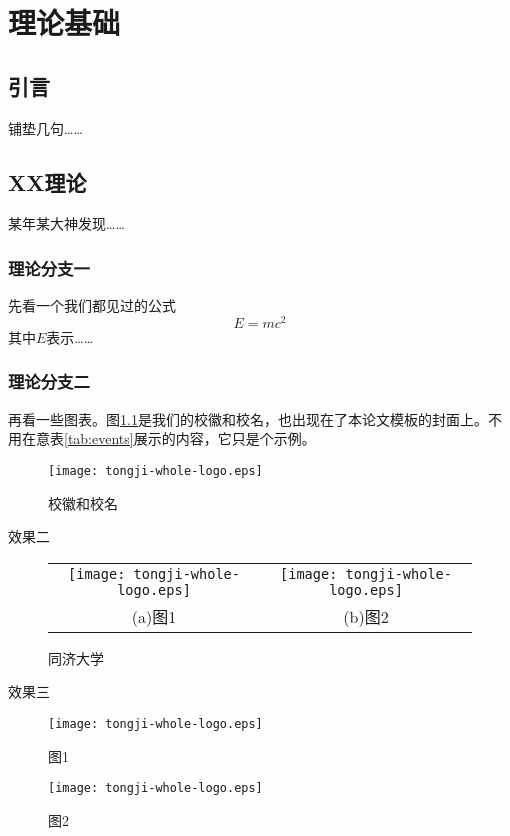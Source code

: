 \chapter{理论基础}
\label{chap:basis}

\section{引言}

铺垫几句……

\section{XX理论}

某年某大神发现……

\subsection{理论分支一}

先看一个我们都见过的公式
\begin{equation}
	E = m c^2
\end{equation}
其中$E$表示……

\subsection{理论分支二}

再看一些图表。图\ref{fig:logo}是我们的校徽和校名，也出现在了本论文模板的封面上。不用在意表\ref{tab:events}展示的内容，它只是个示例。
\begin{figure}[!h]
	\centering
	\texttt{[image: tongji-whole-logo.eps]}
	\caption{校徽和校名}
	\label{fig:logo}
\end{figure}

效果二

\begin{figure}[!h] 
	\centering 
	\begin{tabular}{cc} 
		\texttt{[image: tongji-whole-logo.eps]} & \texttt{[image: tongji-whole-logo.eps]}\\ 
		(a)图1 & (b)图2
	\end{tabular} 
	\caption{同济大学} 
	\label{fig:subimage} 
\end{figure}

效果三

\begin{figure}[!h] 
	\noindent 
	\begin{minipage}[t]{.48\linewidth} 
		\centering 
			\texttt{[image: tongji-whole-logo.eps]} 
		\caption{图1} 
		\label{fig:quadratic} 
	\end{minipage} 
	\begin{minipage}[t]{.48\linewidth} 
		\centering 
		\texttt{[image: tongji-whole-logo.eps]} 
			\caption{图2} 
		\label{fig:triorder} 
	\end{minipage} 
\end{figure}

